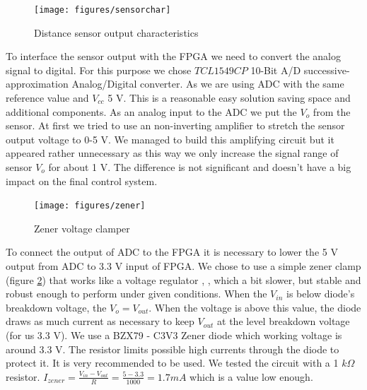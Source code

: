 \begin{figure}[!ht]
	\centering
	\texttt{[image: figures/sensorchar]}
	\caption{Distance sensor output characteristics }
	\label{fig:sensorchar}
\end{figure}


To interface the sensor output with the FPGA we need to convert the analog signal to digital. For this purpose we chose $TCL 1549CP$ 10-Bit A/D  successive-approximation Analog/Digital converter. As we are using ADC with the same reference value and $V_{cc}$ 5 V. This is a reasonable easy solution saving space and additional components. As an analog input to the ADC we put the $V_{o}$ from the sensor. At first we tried to use an non-inverting amplifier to stretch the sensor output voltage to 0-5 V. We managed to build this amplifying circuit but it appeared rather unnecessary as this way we only increase the signal range of sensor $V_{o}$ for about 1 V. The difference is not significant and doesn't have a big impact on the final control system. 

\begin{figure}[!ht]
	\centering
	\texttt{[image: figures/zener]}
	\caption{Zener voltage clamper}
	\label{fig:zener}
\end{figure}

To connect the output of ADC to the FPGA it is necessary to  lower the 5 V output from ADC to 3.3 V input of FPGA.  We chose to use a simple zener clamp (figure \ref{fig:zener}) that works like a voltage regulator \cite{inventors}, \cite{tricks}, which a bit slower, but stable and robust enough to perform under given conditions. When the $V_{in}$  is below diode's breakdown voltage, the $V_{o} = V_{out} $. When the voltage is above this value, the diode draws as much current as necessary to keep $V_{out}$ at the level breakdown voltage (for us 3.3 V). 
We use a BZX79 - C3V3 Zener diode which working voltage is around 3.3 V. The resistor limits possible high currents through the diode to protect it. It is very recommended to be used. We tested the circuit with a 1 $k\Omega$ resistor. $I_{zener}=\frac{V_{in}-V_{out}}{R}=\frac{5-3.3}{1000}= 1.7 mA$  which is a value low enough. 

